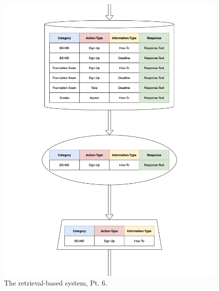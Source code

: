 \documentclass[titlepage, 12pt]{article}
\begin{document}
\begin{figure}[p]
    \centering\includegraphics[width=1\linewidth]{images/retrieval-6.png}
    \caption{The retrieval-based system, Pt. 6.}
\end{figure}
\end{document}
